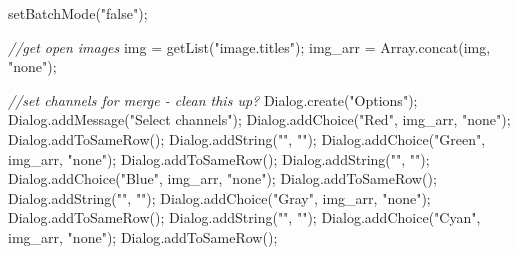 \documentclass[
  12pt,
  a4paper,
]{book}
\newenvironment{Shaded}{}{}
\newcommand{\CommentTok}[1]{\textcolor[rgb]{0.38,0.63,0.69}{\textit{#1}}}
\newcommand{\NormalTok}[1]{#1}
\newcommand{\OperatorTok}[1]{\textcolor[rgb]{0.40,0.40,0.40}{#1}}
\newcommand{\StringTok}[1]{\textcolor[rgb]{0.25,0.44,0.63}{#1}}
\begin{document}
\begin{Shaded}
\begin{Highlighting}[]
\NormalTok{setBatchMode}\OperatorTok{(}\StringTok{"false"}\OperatorTok{);}

\CommentTok{//get open images}
\NormalTok{img }\OperatorTok{=}\NormalTok{ getList}\OperatorTok{(}\StringTok{"image.titles"}\OperatorTok{);}
\NormalTok{img\_arr }\OperatorTok{=}\NormalTok{ Array}\OperatorTok{.}\NormalTok{concat}\OperatorTok{(}\NormalTok{img}\OperatorTok{,} \StringTok{"none"}\OperatorTok{);}

\CommentTok{//set channels for merge {-} clean this up?}
\NormalTok{Dialog}\OperatorTok{.}\NormalTok{create}\OperatorTok{(}\StringTok{"Options"}\OperatorTok{);}
\NormalTok{Dialog}\OperatorTok{.}\NormalTok{addMessage}\OperatorTok{(}\StringTok{"Select channels"}\OperatorTok{);}
\NormalTok{Dialog}\OperatorTok{.}\NormalTok{addChoice}\OperatorTok{(}\StringTok{"Red"}\OperatorTok{,}\NormalTok{ img\_arr}\OperatorTok{,} \StringTok{"none"}\OperatorTok{);}
\NormalTok{Dialog}\OperatorTok{.}\NormalTok{addToSameRow}\OperatorTok{();}
\NormalTok{Dialog}\OperatorTok{.}\NormalTok{addString}\OperatorTok{(}\StringTok{""}\OperatorTok{,} \StringTok{""}\OperatorTok{);}
\NormalTok{Dialog}\OperatorTok{.}\NormalTok{addChoice}\OperatorTok{(}\StringTok{"Green"}\OperatorTok{,}\NormalTok{ img\_arr}\OperatorTok{,} \StringTok{"none"}\OperatorTok{);}
\NormalTok{Dialog}\OperatorTok{.}\NormalTok{addToSameRow}\OperatorTok{();}
\NormalTok{Dialog}\OperatorTok{.}\NormalTok{addString}\OperatorTok{(}\StringTok{""}\OperatorTok{,} \StringTok{""}\OperatorTok{);}
\NormalTok{Dialog}\OperatorTok{.}\NormalTok{addChoice}\OperatorTok{(}\StringTok{"Blue"}\OperatorTok{,}\NormalTok{ img\_arr}\OperatorTok{,} \StringTok{"none"}\OperatorTok{);}
\NormalTok{Dialog}\OperatorTok{.}\NormalTok{addToSameRow}\OperatorTok{();}
\NormalTok{Dialog}\OperatorTok{.}\NormalTok{addString}\OperatorTok{(}\StringTok{""}\OperatorTok{,} \StringTok{""}\OperatorTok{);}
\NormalTok{Dialog}\OperatorTok{.}\NormalTok{addChoice}\OperatorTok{(}\StringTok{"Gray"}\OperatorTok{,}\NormalTok{ img\_arr}\OperatorTok{,} \StringTok{"none"}\OperatorTok{);}
\NormalTok{Dialog}\OperatorTok{.}\NormalTok{addToSameRow}\OperatorTok{();}
\NormalTok{Dialog}\OperatorTok{.}\NormalTok{addString}\OperatorTok{(}\StringTok{""}\OperatorTok{,} \StringTok{""}\OperatorTok{);}
\NormalTok{Dialog}\OperatorTok{.}\NormalTok{addChoice}\OperatorTok{(}\StringTok{"Cyan"}\OperatorTok{,}\NormalTok{ img\_arr}\OperatorTok{,} \StringTok{"none"}\OperatorTok{);}
\NormalTok{Dialog}\OperatorTok{.}\NormalTok{addToSameRow}\OperatorTok{();}

\end{Highlighting}
\end{Shaded}
\end{document}
